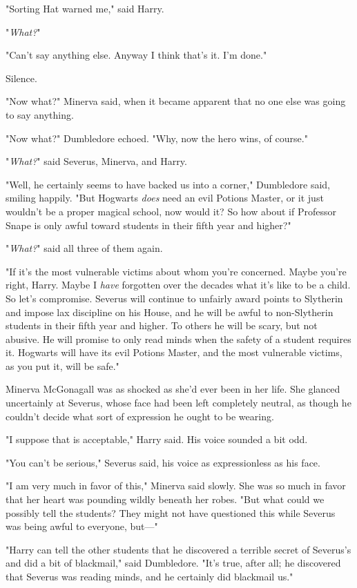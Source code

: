 "Sorting Hat warned me," said Harry.

"\emph{What?}"

"Can't say anything else. Anyway I think that's it. I'm done."

Silence.

"Now what?" Minerva said, when it became apparent that no one else was going to
say anything.

"Now what?" Dumbledore echoed. "Why, now the hero wins, of course."

"\emph{What?}" said Severus, Minerva, and Harry.

"Well, he certainly seems to have backed us into a corner," Dumbledore said,
smiling happily. "But Hogwarts \emph{does} need an evil Potions Master, or it
just wouldn't be a proper magical school, now would it? So how about if
Professor Snape is only awful toward students in their fifth year and higher?"

"\emph{What?}" said all three of them again.

"If it's the most vulnerable victims about whom you're concerned. Maybe you're
right, Harry. Maybe I \emph{have} forgotten over the decades what it's like to
be a child. So let's compromise. Severus will continue to unfairly award points
to Slytherin and impose lax discipline on his House, and he will be awful to
non-Slytherin students in their fifth year and higher. To others he will be
scary, but not abusive. He will promise to only read minds when the safety of a
student requires it. Hogwarts will have its evil Potions Master, and the most
vulnerable victims, as you put it, will be safe."

Minerva McGonagall was as shocked as she'd ever been in her life. She glanced
uncertainly at Severus, whose face had been left completely neutral, as though
he couldn't decide what sort of expression he ought to be wearing.

"I suppose that is acceptable," Harry said. His voice sounded a bit odd.

"You can't be serious," Severus said, his voice as expressionless as his face.

"I am very much in favor of this," Minerva said slowly. She was so much in
favor that her heart was pounding wildly beneath her robes. "But what could we
possibly tell the students? They might not have questioned this while Severus
was{\el} being awful to everyone, but\mbox{---}"

"Harry can tell the other students that he discovered a terrible secret of
Severus's and did a bit of blackmail," said Dumbledore. "It's true, after all;
he discovered that Severus was reading minds, and he certainly did blackmail
us."


